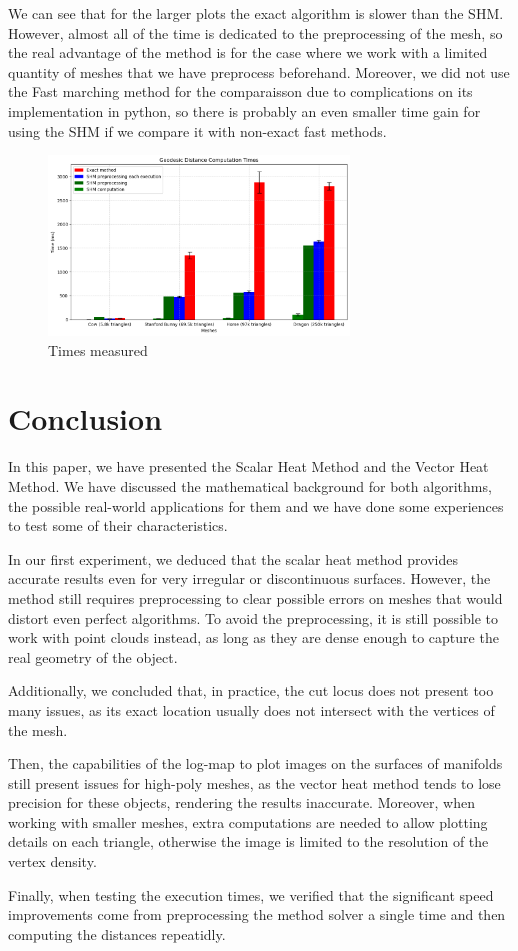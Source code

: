 \documentclass[sigconf]{acmart}
\begin{document}
We can see that for the larger plots the exact algorithm is slower than the SHM. 
However, almost all of the time is dedicated to the preprocessing of the mesh, 
so the real advantage of the method is for the case where we work with a limited
quantity of meshes that we have preprocess beforehand. Moreover, we did not
use the Fast marching method for the comparaisson due to complications on its
implementation in python, so there is probably an even smaller time gain for using
the SHM if we compare it with non-exact fast methods.

\begin{figure}
  \centering
  \includegraphics[width=8cm]{time_graphs.png}
  \caption{Times measured}
  \label{fig:time_graphs}
\end{figure}

\section{Conclusion}

In this paper, we have presented the Scalar Heat Method and the Vector Heat Method. We have discussed the mathematical background for both algorithms, the possible real-world applications for them and we have done some experiences to test some of their characteristics.

In our first experiment, we deduced that the scalar heat method provides accurate results even for very irregular or discontinuous surfaces. However, the method still requires preprocessing to clear possible errors on meshes that would distort even perfect algorithms. To avoid the preprocessing, it is still possible to work with point clouds instead, as long as they are dense enough to capture the real geometry of the object.

Additionally, we concluded that, in practice, the cut locus does not present too many issues, as its exact location usually does not intersect with the vertices of the mesh.

Then, the capabilities of the log-map to plot images on the surfaces of manifolds still present issues for high-poly meshes, as the vector heat method tends to lose precision for these objects, rendering the results inaccurate. Moreover, when working with smaller meshes, extra computations are needed to allow plotting details on each triangle, otherwise the image is limited to the resolution of the vertex density.

Finally, when testing the execution times, we verified that the significant speed improvements come from preprocessing the method solver a single time and then computing the distances repeatidly. 



\end{document}
